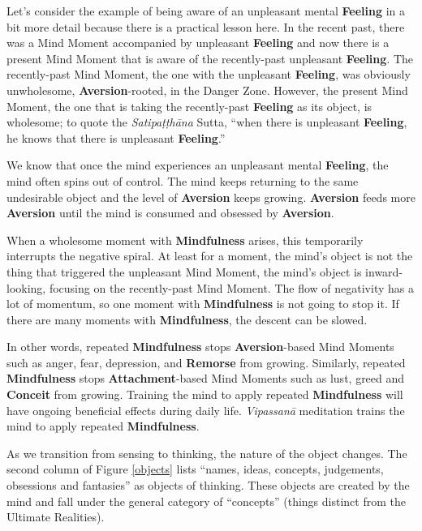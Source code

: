 \pagebreak

Let’s consider the example of being aware of an unpleasant mental \textbf{Feeling} in a bit more detail because there is a practical lesson here. In the recent past, there was a Mind Moment accompanied by unpleasant \textbf{Feeling} and now there is a present Mind Moment that is aware of the recently-past unpleasant \textbf{Feeling}. The recently-past Mind Moment, the one with the unpleasant \textbf{Feeling}, was obviously unwholesome, \textbf{Aversion}-rooted, in the Danger Zone. However, the present Mind Moment, the one that is taking the recently-past \textbf{Feeling} as its object, is wholesome; to quote the \textit{Satipaṭṭhāna} Sutta, “when there is unpleasant \textbf{Feeling}, he knows that there is unpleasant \textbf{Feeling}.”

We know that once the mind experiences an unpleasant mental \textbf{Feeling}, the mind often spins out of control. The mind keeps returning to the same undesirable object and the level of \textbf{Aversion} keeps growing. \textbf{Aversion} feeds more \textbf{Aversion} until the mind is consumed and obsessed by \textbf{Aversion}.

When a wholesome moment with \textbf{Mindfulness} arises, this temporarily interrupts the negative spiral. At least for a moment, the mind’s object is not the thing that triggered the unpleasant Mind Moment, the mind’s object is inward-looking, focusing on the recently-past Mind Moment. The flow of negativity has a lot of momentum, so one moment with \textbf{Mindfulness} is not going to stop it. If there are many moments with \textbf{Mindfulness}, the descent can be slowed.

In other words, repeated \textbf{Mindfulness} stops \textbf{Aversion}-based Mind Moments such as anger, fear, depression, and \textbf{Remorse} from growing. Similarly, repeated \textbf{Mindfulness} stops \textbf{Attachment}-based Mind Moments such as lust, greed and \textbf{Conceit} from growing. Training the mind to apply repeated \textbf{Mindfulness} will have ongoing beneficial effects during daily life. \textit{Vipassanā} meditation trains the mind to apply repeated \textbf{Mindfulness}.

As we transition from sensing to thinking, the nature of the object changes. The second column of Figure \ref{objects} lists “names, ideas, concepts, judgements, obsessions and fantasies” as objects of thinking. These objects are created by the mind and fall under the general category of “concepts” (things distinct from the Ultimate Realities).

